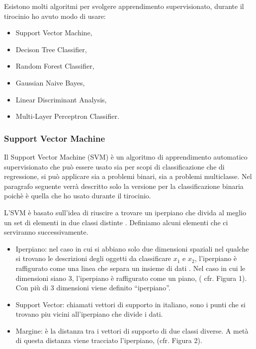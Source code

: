 \documentclass[12pt,italian]{report}
\begin{document}
Esistono molti algoritmi per svolgere apprendimento supervisionato, durante il tirocinio ho avuto modo di usare:
\begin{itemize}
	\item Support Vector Machine,
	\item Decison Tree Classifier,
	\item Random Forest Classifier,
	\item Gaussian Naive Bayes,
	\item Linear Discriminant Analysis,
	\item Multi-Layer Perceptron Classifier.
\end{itemize}

\subsubsection{Support Vector Machine}
\label{sec:SVC}
Il Support Vector Machine (SVM) è un algoritmo di apprendimento automatico supervisionato che può essere usato sia per scopi di classificazione che di regressione, si può applicare sia a problemi binari, sia a problemi multiclasse. Nel paragrafo seguente verrà descritto solo la versione per la classificazione binaria poichè è quella che ho usato durante il tirocinio.

L'SVM è basato sull'idea di riuscire a trovare un iperpiano che divida al meglio un set di elementi in due classi distinte \cite{LectureNotesNg}. Definiamo alcuni elementi che ci serviranno successivamente.


\begin{itemize}
	\item Iperpiano: nel caso in cui si abbiano solo due dimensioni spaziali nel qualche si trovano le descrizioni degli oggetti da classificare $x_1$ e $x_2$, l'iperpiano è raffigurato come una linea che separa un insieme di dati \cite{LectureNotesNg}. Nel caso in cui le dimensioni siano 3, l'iperpiano è raffigurato come un piano, ( cfr. Figura 1).
	Con più di 3 dimensioni viene definito ``iperpiano''.
	\item Support Vector: chiamati vettori di supporto in italiano, sono i punti che si trovano piu vicini all'iperpiano che divide i dati.
	\item Margine: è la distanza tra i vettori di supporto di due classi diverse. A metà di questa distanza viene tracciato l'iperpiano, (cfr. Figura 2).
\end{itemize}
\end{document}
